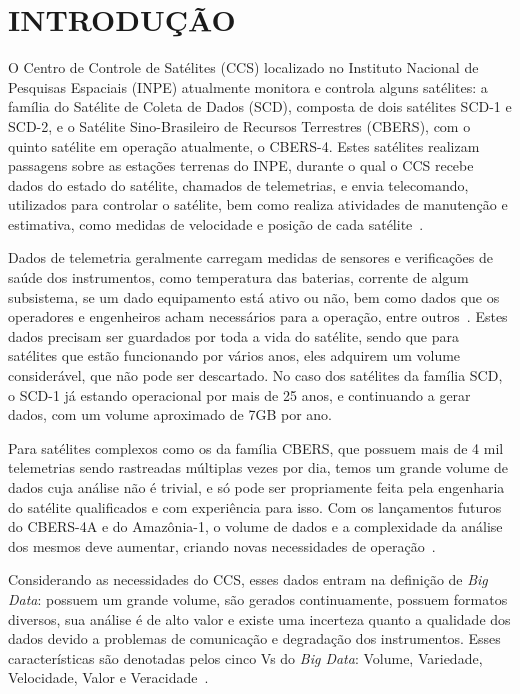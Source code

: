 
\chapter{INTRODUÇÃO}
\label{ch:intro}

O Centro de Controle de Satélites (CCS) localizado no Instituto Nacional de Pesquisas Espaciais (INPE) atualmente monitora e controla alguns satélites: a família do Satélite de Coleta de Dados (SCD), composta de dois satélites SCD-1 e SCD-2, e o Satélite Sino-Brasileiro de Recursos Terrestres (CBERS), com o quinto satélite em operação atualmente, o CBERS-4.
Estes satélites realizam passagens sobre as estações terrenas do INPE, durante o qual o CCS recebe dados do estado do satélite, chamados de telemetrias, e envia telecomando, utilizados para controlar o satélite, bem como realiza atividades de manutenção e estimativa, como medidas de velocidade e posição de cada satélite~\cite{AzevedoAmbr:2010:ArSaTe}.

Dados de telemetria geralmente carregam medidas de sensores e verificações de saúde dos instrumentos, como temperatura das baterias, corrente de algum subsistema, se um dado equipamento está ativo ou não, bem como dados que os operadores e engenheiros acham necessários para a operação, entre outros~\cite{larsonSpaceMissionAnalysis1999}.
Estes dados precisam ser guardados por toda a vida do satélite, sendo que para satélites que estão funcionando por vários anos, eles adquirem um volume considerável, que não pode ser descartado.
No caso dos satélites da família SCD, o SCD-1 já estando operacional por mais de 25 anos, e continuando a gerar dados, com um volume aproximado de 7GB por ano.

Para satélites complexos como os da família CBERS, que possuem mais de 4 mil telemetrias sendo rastreadas múltiplas vezes por dia, temos um grande volume de dados cuja análise não é trivial, e só pode ser propriamente feita pela engenharia do satélite qualificados e com experiência para isso.
Com os lançamentos futuros do CBERS-4A e do Amazônia-1, o volume de dados e a complexidade da análise dos mesmos deve aumentar, criando novas necessidades de operação~\cite{JulioFoAmbrFerrLour:2017:ChImSp}.

Considerando as necessidades do CCS, esses dados entram na definição de \textit{Big Data}: possuem um grande volume, são gerados continuamente, possuem formatos diversos, sua análise é de alto valor e existe uma incerteza quanto a qualidade dos dados devido a problemas de comunicação e degradação dos instrumentos.
Esses características são denotadas pelos cinco Vs do \textit{Big Data}: Volume, Variedade, Velocidade, Valor e Veracidade~\cite{kacfahemaniUnderstandableBigData2015}.

